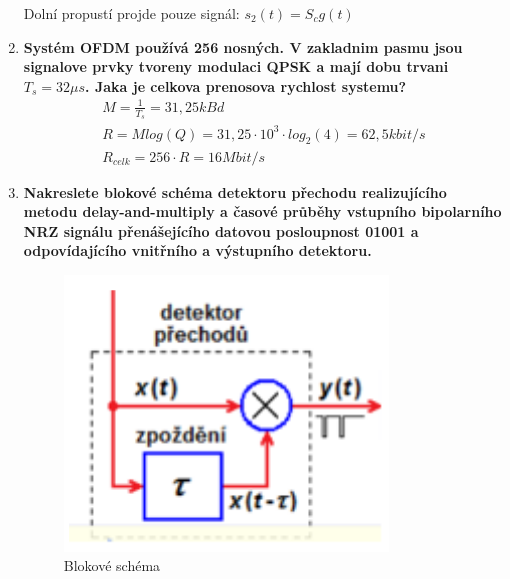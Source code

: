 \begin{enumerate}
    Dolní propustí projde pouze signál: \(s_2(t) = S_cg(t)\)
    \item \textbf{Systém OFDM používá 256 nosných. V zakladnim pasmu jsou signalove prvky tvoreny
    modulaci QPSK a mají dobu trvani \(T_s = 32\mu s\). Jaka je celkova prenosova rychlost
    systemu?}
    \begin{gather*}
        M = \frac{1}{T_s} = 31,25kBd\\
        R = Mlog(Q) = 31,25\cdot 10^3 \cdot log_2(4) = 62,5kbit/s\\
        R_{celk} = 256\cdot R = 16Mbit/s
    \end{gather*}
    \item \textbf{Nakreslete blokové schéma detektoru přechodu realizujícího metodu delay-and-multiply a
    časové průběhy vstupního bipolarního NRZ signálu přenášejícího datovou posloupnost
    01001 a odpovídajícího vnitřního a výstupního detektoru.
    }
    \begin{figure}[h]
        \centering
        \includegraphics[scale = 0.5]{images/delay-multiply.png}
        \caption{Blokové schéma}
    \end{figure}\\
    \begin{figure}[h]
        \centering

\end{figure}
\end{enumerate}
